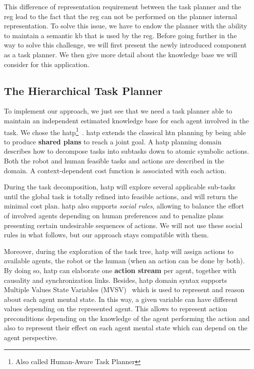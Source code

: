 This difference of representation requirement between the task planner and the \acrshort{reg} lead to the fact that the \acrshort{reg} can not be performed on the planner internal representation. To solve this issue, we have to endow the planner with the ability to maintain a semantic \acrshort{kb} that is used by the \acrshort{reg}. Before going further in the way to solve this challenge, we will first present the newly introduced component as a task planner. We then give more detail about the knowledge base we will consider for this application.


\subsection{The Hierarchical Task Planner}

To implement our approach, we just see that we need a task planner able to maintain an independent estimated knowledge base for each agent involved in the task. We chose the \acrfull{hatp}\footnote{Also called Human-Aware Task Planner}~\cite{lallement_2014_hatp}. \acrshort{hatp} extends the classical \acrfull{htn} planning by being able to produce \textbf{shared plans} to reach a joint goal. A \acrshort{hatp} planning domain describes how to decompose tasks into subtasks down to atomic symbolic actions. Both the robot and human feasible tasks and actions are described in the domain. A context-dependent cost function is associated with each action. 

During the task decomposition, \acrshort{hatp} will explore several applicable sub-tasks until the global task is totally refined into feasible actions, and will return the minimal cost plan. \acrshort{hatp} also supports \textit{social rules}, allowing to balance the effort of involved agents depending on human preferences and to penalize plans presenting certain undesirable sequences of actions. We will not use these social rules in what follows, but our approach stays compatible with them.

Moreover, during the exploration of the task tree, \acrshort{hatp} will assign actions to available agents, the robot or the human (when an action can be done by both). By doing so, \acrshort{hatp} can elaborate one \textbf{action stream} per agent, together with causality and synchronization links. 
Besides, \acrshort{hatp} domain syntax supports Multiple Values State Variables (MVSV)~\cite{guitton_2012_belief} which is used to represent and reason about each agent mental state. In this way, a given variable can have different values depending on the represented agent. This allows to represent action preconditions depending on the knowledge of the agent performing the action and also to represent their effect on each agent mental state which can depend on the agent perspective.

